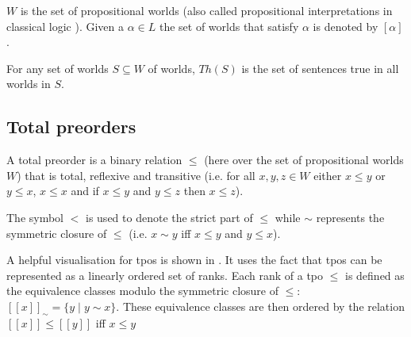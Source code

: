 \documentclass[11pt]{scrartcl}
\theoremstyle{definition}
\theoremstyle{definition}
\begin{document}
$W$ is the set of propositional worlds (also called propositional interpretations in classical logic \cite{Kai2020}). Given a $\alpha \in L$ the set of worlds that satisfy $\alpha$ is denoted by $[\alpha]$.

For any set of worlds $S \subseteq W$ of worlds, $Th(S)$ is the set of sentences true in all worlds in $S$.

\subsection{Total preorders}
A total preorder is a binary relation $\leq$ (here over the set of propositional worlds $W$) that is total, reflexive and transitive (i.e. for all $x, y, z \in W$ either $x \leq y$ or $y \leq x$, $x \leq x$ and if $x \leq y$ and $y \leq z$ then $x \leq z$).

The symbol $<$ is used to denote the strict part of $\leq$ while $\sim$ represents the symmetric closure of $\leq$ (i.e. $x \sim y$ iff $x \leq y$ and $y \leq x$).

A helpful visualisation for tpos is shown in \cite{Booth2006}. It uses the fact that tpos can be represented as a linearly ordered set of ranks. Each rank of a tpo $\leq$ is defined as the equivalence classes modulo the symmetric closure of $\leq$: $[[x]]_{\sim} = \{y \mid y \sim x\}$. These equivalence classes are then ordered by the relation $[[x]] \leq [[y]]$ iff $x \leq y$
\end{document}
